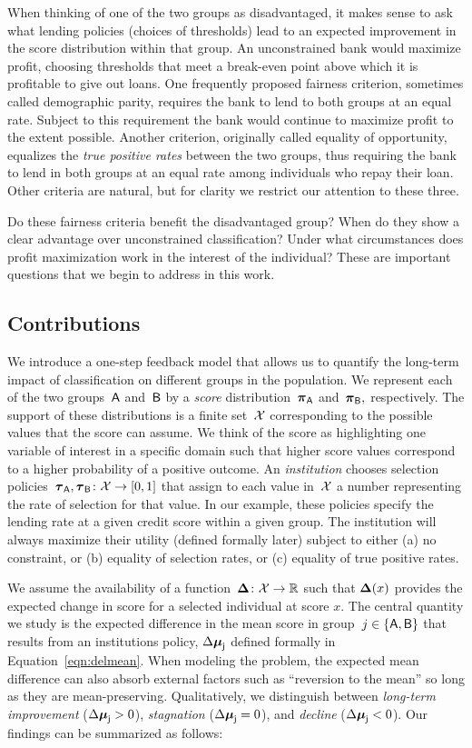 When thinking of one of the two groups as disadvantaged, it makes sense to ask
what lending policies (choices of thresholds) lead to an expected improvement in
the score distribution within that group. An unconstrained bank would maximize
profit, choosing thresholds that meet a break-even point above which it is
profitable to give out loans. One frequently proposed fairness criterion,
sometimes called demographic parity, requires the bank to lend to both groups at
an equal rate. Subject to this requirement the bank would continue to maximize
profit to the extent possible. 
Another criterion, originally called equality of opportunity, equalizes
the \emph{true positive rates} between the two groups, thus requiring the bank to lend in
both groups at an equal rate among individuals who repay their loan. Other
criteria are natural, but for clarity we restrict our attention to these three.

Do these fairness criteria benefit the disadvantaged group? When do they show a
clear advantage over unconstrained classification? Under what circumstances does
profit maximization work in the interest of the individual? These are important
questions that we begin to address in this work.

\subsection{Contributions}
We introduce a one-step feedback model that allows us to quantify the long-term
impact of classification on different groups in the population. We represent
each of the two groups~$\mathsf{A}$ and~$\mathsf{B}$ by a \emph{score}
distribution~$\boldsymbol{\pi}_{\mathsf{A}}$ and~$\boldsymbol{\pi}_{\mathsf{B}},$ respectively. The support of these
distributions is a finite set~$\mathcal{X}$ corresponding to the possible values that the
score can assume. We think of the score as highlighting one variable of interest
in a specific domain such that higher score values correspond to a
higher probability of a positive outcome.  
An \emph{institution} chooses selection policies~$\boldsymbol{\tau}_{\mathsf{A}},
\boldsymbol{\tau}_{\mathsf{B}}\colon\mathcal{X}\to[0,1]$ that assign to each value in~$\mathcal{X}$ a number representing
the rate of selection for that value. In our example, these policies specify
the lending rate at a given credit score within a given group. The institution
will always maximize their utility (defined formally later) subject to either
(a) no constraint, or (b) equality of selection rates, or (c) equality of true
positive rates.

We assume the availability of a function~$\boldsymbol{\Delta}\colon\mathcal{X}\to\mathbb{R}$ such that $\boldsymbol{\Delta}(x)$ provides the
expected change in score for a selected individual at score $x$.  The
central quantity we study is the expected difference in the mean
score in group~$j\in\{\mathsf{A}, \mathsf{B}\}$ that results from an institutions policy, $\Delta\boldsymbol{\mu}_{\mathsf{j}}$ defined formally in Equation~\eqref{eqn:delmean}. 
When modeling the problem, the expected mean difference can also absorb external
factors such as ``reversion to the mean'' so long as they are mean-preserving.
Qualitatively, we distinguish between \emph{long-term improvement}
($\Delta\boldsymbol{\mu}_{\mathsf{j}}>0$), \emph{stagnation} ($\Delta\boldsymbol{\mu}_{\mathsf{j}}=0$), and \emph{decline}
($\Delta\boldsymbol{\mu}_{\mathsf{j}}<0$).
Our findings can be summarized as follows:

